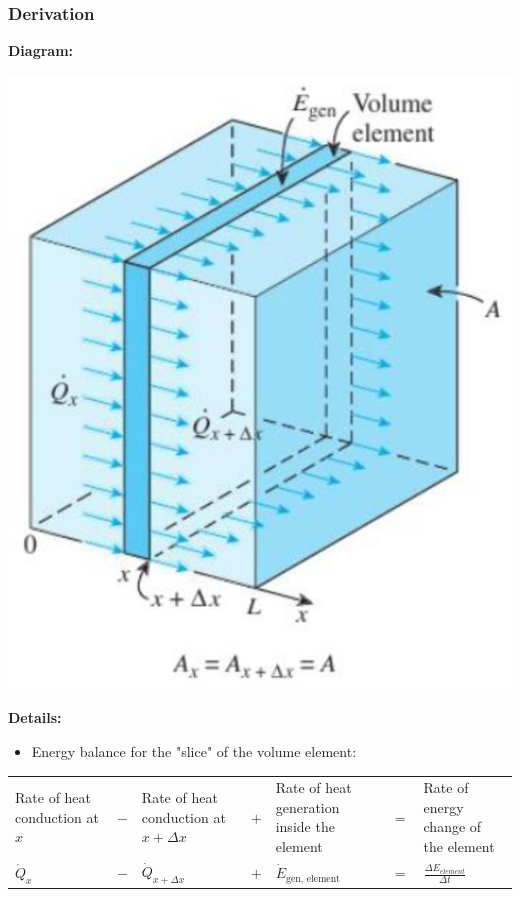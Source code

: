 \documentclass[11pt]{article}
\begin{document}
\subsubsection{Derivation}
\label{sec:org7e6d22d}
\textbf{Diagram:}
\begin{center}
\includegraphics[scale=0.5]{./images/one-dimensional-heat-conduction.png}
\end{center}

\textbf{Details:}
\begin{itemize}
\item Energy balance for the "slice" of the volume element:
\end{itemize}
\begin{center}
\begin{tabular}{>{\centering\arraybackslash}m{7em} >{\centering\arraybackslash}m{1em} >{\centering\arraybackslash}m{7em} >{\centering\arraybackslash}m{1em} >{\centering\arraybackslash}m{7em} >{\centering\arraybackslash}m{1em} >{\centering\arraybackslash}m{7em}}
Rate of heat conduction at \(x\) & \(-\) & Rate of heat conduction at \(x + \Delta x\) & \(+\) & Rate of heat generation inside the element & \(=\) & Rate of energy change of the element\\
\(\dot{Q}_x\) & \(-\) & \(\dot{Q}_{x + \Delta x}\) & \(+\) & \(\dot{E}_{\text{gen, element}}\) & \(=\) & \(\frac{\Delta E_{element}}{\Delta t}\)\\
\end{tabular}
\end{center}
\end{document}
